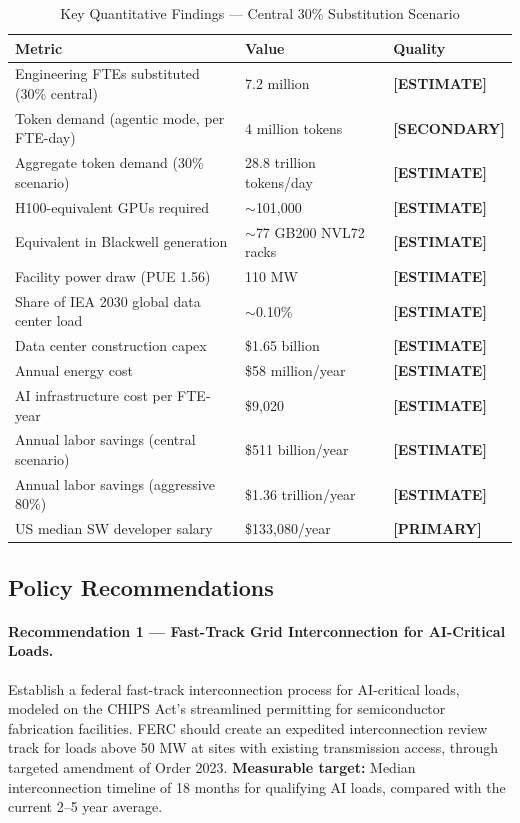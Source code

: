\documentclass{article}
\newcommand{\PRIMARY}{\textbf{[PRIMARY]}}
\newcommand{\SECONDARY}{\textbf{[SECONDARY]}}
\newcommand{\ESTIMATE}{\textbf{[ESTIMATE]}}
\begin{document}
\begin{table}[ht]
\centering
\caption{Key Quantitative Findings --- Central 30\% Substitution Scenario}
\label{tab:key-findings}
\small
\begin{tabular}{@{}p{6cm}p{3cm}p{2.5cm}@{}}
\toprule
\textbf{Metric} & \textbf{Value} & \textbf{Quality} \\
\midrule
Engineering FTEs substituted (30\% central) & 7.2 million & \ESTIMATE{} \\
Token demand (agentic mode, per FTE-day) & 4 million tokens & \SECONDARY{} \\
Aggregate token demand (30\% scenario) & 28.8 trillion tokens/day & \ESTIMATE{} \\
H100-equivalent GPUs required & $\sim$101,000 & \ESTIMATE{} \\
Equivalent in Blackwell generation & $\sim$77 GB200 NVL72 racks & \ESTIMATE{} \\
Facility power draw (PUE 1.56) & 110 MW & \ESTIMATE{} \\
Share of IEA 2030 global data center load & $\sim$0.10\% & \ESTIMATE{} \\
Data center construction capex & \$1.65 billion & \ESTIMATE{} \\
Annual energy cost & \$58 million/year & \ESTIMATE{} \\
AI infrastructure cost per FTE-year & \$9,020 & \ESTIMATE{} \\
Annual labor savings (central scenario) & \$511 billion/year & \ESTIMATE{} \\
Annual labor savings (aggressive 80\%) & \$1.36 trillion/year & \ESTIMATE{} \\
US median SW developer salary & \$133,080/year & \PRIMARY{} \\
\bottomrule
\end{tabular}
\end{table}

\subsection{Policy Recommendations}

\paragraph{Recommendation 1 --- Fast-Track Grid Interconnection for AI-Critical Loads.}
Establish a federal fast-track interconnection process for AI-critical loads, modeled on
the CHIPS Act's streamlined permitting for semiconductor fabrication facilities. FERC
should create an expedited interconnection review track for loads above 50 MW at sites
with existing transmission access, through targeted amendment of Order 2023.
\textbf{Measurable target:} Median interconnection timeline of 18 months for qualifying
AI loads, compared with the current 2--5 year average.
\end{document}
